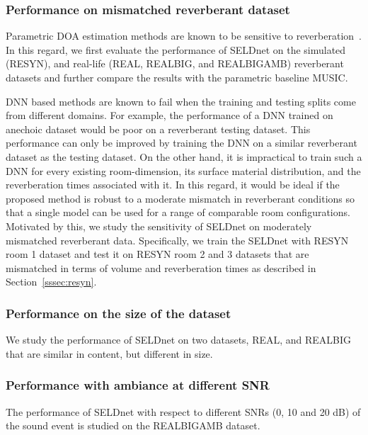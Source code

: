 \documentclass[journal]{IEEEtran}
\begin{document}
\subsubsection{Performance on mismatched reverberant dataset}
Parametric DOA estimation methods are known to be sensitive to reverberation~\cite{dibiase2001robust}. In this regard, we first evaluate the performance of SELDnet on the simulated (RESYN), and real-life (REAL, REALBIG, and REALBIGAMB) reverberant datasets and further compare the results with the parametric baseline MUSIC.

DNN based methods are known to fail when the training and testing splits come from different domains. For example, the performance of a DNN trained on anechoic dataset would be poor on a reverberant testing dataset. This performance can only be improved by training the DNN on a similar reverberant dataset as the testing dataset. On the other hand, it is impractical to train such a DNN for every existing room-dimension, its surface material distribution, and the reverberation times associated with it. In this regard, it would be ideal if the proposed method is robust to a moderate mismatch in reverberant conditions so that a single model can be used for a range of comparable room configurations. Motivated by this, we study the sensitivity of SELDnet on moderately mismatched reverberant data. Specifically, we train the SELDnet with RESYN room 1 dataset and test it on RESYN room 2 and 3 datasets that are mismatched in terms of volume and reverberation times as described in Section~\ref{sssec:resyn}.


\subsubsection{Performance on the size of the dataset}
We study the performance of SELDnet on two datasets, REAL, and REALBIG that are similar in content, but different in size.




\subsubsection{Performance with ambiance at different SNR}

The performance of SELDnet with respect to different SNRs (0, 10 and 20 dB) of the sound event is studied on the REALBIGAMB dataset.
\end{document}
